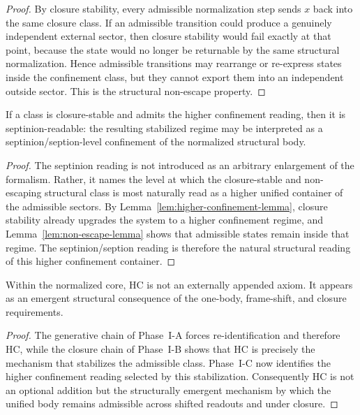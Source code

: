 \begin{proof}
By closure stability, every admissible normalization step sends $x$ back into
the same closure class. If an admissible transition could produce a genuinely
independent external sector, then closure stability would fail exactly at that
point, because the state would no longer be returnable by the same structural
normalization. Hence admissible transitions may rearrange or re-express states
inside the confinement class, but they cannot export them into an independent
outside sector. This is the structural non-escape property.
\end{proof}

\begin{theorem}
\label{thm:septinion-readability-theorem}
If a class is closure-stable and admits the higher confinement reading, then it
is septinion-readable: the resulting stabilized regime may be interpreted as a
septinion/seption-level confinement of the normalized structural body.
\end{theorem}

\begin{proof}
The septinion reading is not introduced as an arbitrary enlargement of the
formalism. Rather, it names the level at which the closure-stable and
non-escaping structural class is most naturally read as a higher unified
container of the admissible sectors. By Lemma~\ref{lem:higher-confinement-lemma},
closure stability already upgrades the system to a higher confinement regime,
and Lemma~\ref{lem:non-escape-lemma} shows that admissible states remain inside
that regime. The septinion/seption reading is therefore the natural structural
reading of this higher confinement container.
\end{proof}

\begin{corollary}
\label{cor:hc-emergent-structural-consequence}
Within the normalized core, HC is not an externally appended axiom. It appears
as an emergent structural consequence of the one-body, frame-shift, and closure
requirements.
\end{corollary}

\begin{proof}
The generative chain of Phase~I-A forces re-identification and therefore HC,
while the closure chain of Phase~I-B shows that HC is precisely the mechanism
that stabilizes the admissible class. Phase~I-C now identifies the higher
confinement reading selected by this stabilization. Consequently HC is not an
optional addition but the structurally emergent mechanism by which the unified
body remains admissible across shifted readouts and under closure.
\end{proof}

